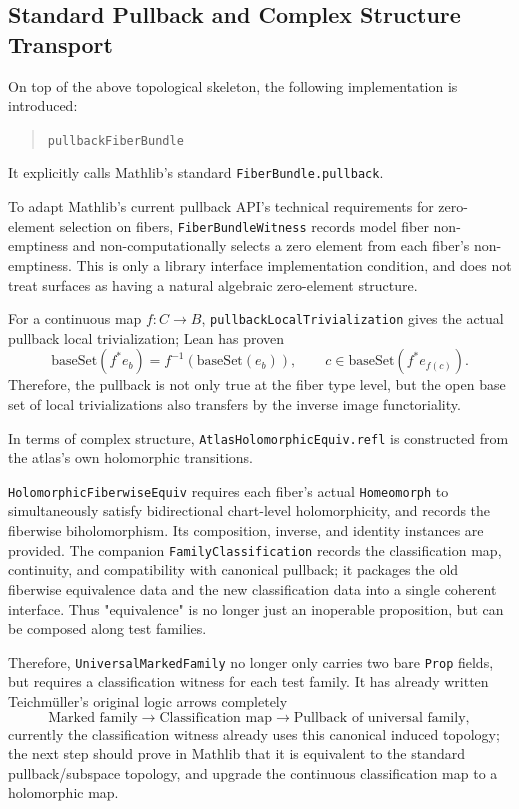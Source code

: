 \documentclass[UTF8,a4paper,11pt]{article}
\begin{document}
\subsection{Standard Pullback and Complex Structure Transport}

On top of the above topological skeleton, the following implementation is introduced:
\begin{quote}
\texttt{pullbackFiberBundle}
\end{quote}
It explicitly calls Mathlib's standard \texttt{FiberBundle.pullback}.

To adapt Mathlib's current pullback API's technical requirements for zero-element selection on fibers,
\texttt{FiberBundleWitness} records model fiber non-emptiness and non-computationally selects a zero element from each fiber's non-emptiness. This is only a library interface implementation condition, and does not treat surfaces as having a natural algebraic zero-element structure.

For a continuous map $f:C\to B$, \texttt{pullbackLocalTrivialization} gives the actual pullback local trivialization; Lean has proven
\[
  \mathrm{baseSet}(f^*e_b)=f^{-1}(\mathrm{baseSet}(e_b)),
  \qquad
  c\in\mathrm{baseSet}(f^*e_{f(c)}).
\]
Therefore, the pullback is not only true at the fiber type level, but the open base set of local trivializations also transfers by the inverse image functoriality.

In terms of complex structure, \texttt{AtlasHolomorphicEquiv.refl} is constructed from the atlas's own holomorphic transitions.

\texttt{HolomorphicFiberwiseEquiv} requires each fiber's actual \texttt{Homeomorph} to simultaneously satisfy bidirectional chart-level holomorphicity, and records the fiberwise biholomorphism. Its composition, inverse, and identity instances are provided. The companion
\texttt{FamilyClassification} records the classification map, continuity, and compatibility with canonical pullback; it packages the old fiberwise equivalence data and the new classification data into a single coherent interface. Thus "equivalence" is no longer just an inoperable proposition, but can be composed along test families.

Therefore, \texttt{UniversalMarkedFamily} no longer only carries two bare \texttt{Prop} fields, but requires a classification witness for each test family. It has already written Teichmüller's original logic arrows completely
\[
  \text{Marked family}\longrightarrow\text{Classification map}\longrightarrow\text{Pullback of universal family},
\]
currently the classification witness already uses this canonical induced topology; the next step should prove in Mathlib that it is equivalent to the standard pullback/subspace topology, and upgrade the continuous classification map to a holomorphic map.
\end{document}
